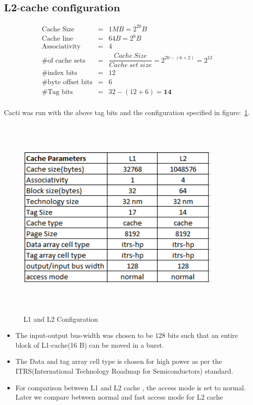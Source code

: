 \documentclass{tufte-handout}
\begin{document}
	\subsection{$\textbf{L2-cache configuration}$}
		\begin{eqnarray*}	
			\mbox{Cache Size } &=& 1 MB = 2^{20} B \\
			\mbox{Cache line} &=& 64 B = 2^6 B \\
			\mbox{Associativity} &=& 4 \\
			\mbox{\# of cache sets} &=&  \dfrac{Cache\ Size}{Cache\ set\ size} = 2^{20-(6+2)} = 2^{12} \\
			\mbox{\# index bits} &=& 12 \\ 
			\mbox{\# byte offset bits} &=& 6 \\
			\mbox{\# Tag bits} &=& 32 - (12+6) = \mathbf{14} \\ 
		\end{eqnarray*}

		Cacti was run with the above tag bits and the configuration specified in figure:~\ref{fig:initConfig}.
		\begin{figure}[h!]
		\label{fig:initConfig}
		\centering
		\includegraphics[width = 4in, height = 4in]{initConfig}
		\caption{L1 and L2 Configuration }
		\end{figure}

		\begin{itemize}
			\item The input-output bus-width was chosen to be $128$ bits such that an entire block of L1-cache(16 B) can be moved in a burst. 
			\item The Data and tag array cell type is chosen for high power as per the ITRS(International Technology Roadmap for Semiconductors) standard.
			\item For comparison between L1 and L2  cache , the access mode is set to normal. Later we compare between normal and fast access mode for L2 cache
		\end{itemize}
\end{document}
